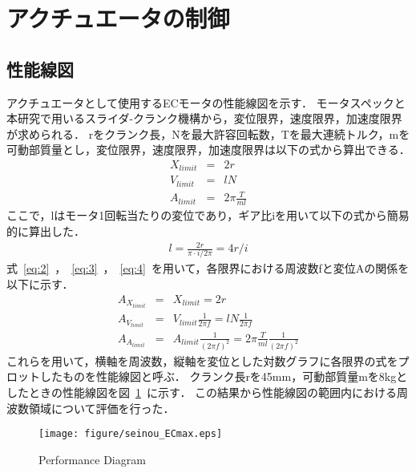 \documentclass[a4paper,12pt]{article_vdlab_sotsuron}
\begin{document}
\newpage
\section{アクチュエータの制御}
\subsection{性能線図}
アクチュエータとして使用するECモータの性能線図を示す．
モータスペックと本研究で用いるスライダ-クランク機構から，変位限界，速度限界，加速度限界が求められる．
rをクランク長，Nを最大許容回転数，Tを最大連続トルク，mを可動部質量とし，変位限界，速度限界，加速度限界は以下の式から算出できる．
\vspace{-8mm}
\begin{eqnarray}
 \label{eq:2} X_{limit} &=& 2r \\
 \label{eq:3} V_{limit} &=& lN \\
 \label{eq:4} A_{limit} &=& 2\pi\frac{T}{ml}
\end{eqnarray}
ここで，lはモータ1回転当たりの変位であり，ギア比iを用いて以下の式から簡易的に算出した．
\vspace*{-2mm}
\begin{eqnarray}
 \label{eq:5} l = \frac{2r}{\pi\cdot i/2\pi} = 4r/i
\end{eqnarray}
式~\ref{eq:2}~，~\ref{eq:3}~，~\ref{eq:4}~を用いて，各限界における周波数fと変位Aの関係を以下に示す．
\vspace*{-2mm}
\begin{eqnarray}
 \label{eq:6} A_{X_{limit}} &=& X_{limit} = 2r \\
 \label{eq:7} A_{V_{limit}} &=& V_{limit}\frac{1}{2\pi f} =  lN\frac{1}{2\pi f}\\
 \label{eq:8} A_{A_{limit}} &=& A_{limit}\frac{1}{(2\pi f)^2} = 2\pi\frac{T}{ml}\frac{1}{(2\pi f)^2}
\end{eqnarray}
これらを用いて，横軸を周波数，縦軸を変位とした対数グラフに各限界の式をプロットしたものを性能線図と呼ぶ．
クランク長rを45mm，可動部質量mを8kgとしたときの性能線図を図~\ref{fig:seinou}~に示す．
この結果から性能線図の範囲内における周波数領域について評価を行った．

\vspace*{-2mm}
\begin{figure}[h]
  \begin{center}
    \texttt{[image: figure/seinou\_ECmax.eps]}
    \vspace*{3mm}
    \caption{Performance Diagram}
    \label{fig:seinou}
  \end{center}
\end{figure}
\end{document}
